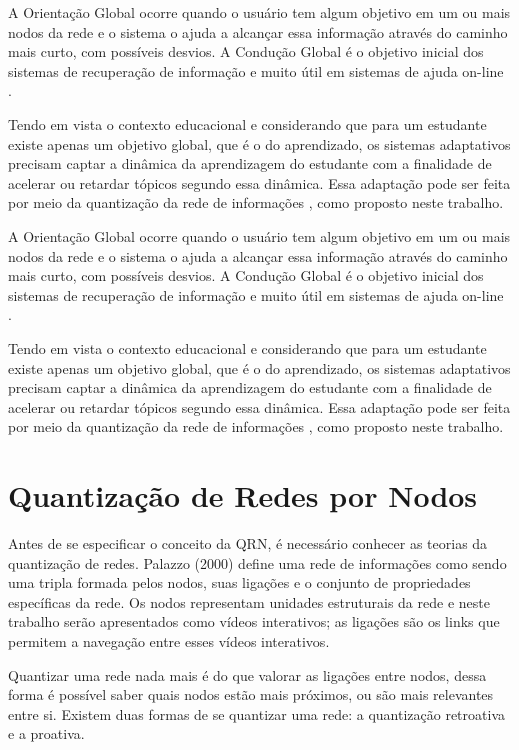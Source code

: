 A Orientação Global ocorre quando o usuário tem algum objetivo em um ou mais nodos da rede e o sistema o ajuda a alcançar essa informação através do caminho mais curto, com possíveis desvios. A Condução Global é o objetivo inicial dos sistemas de recuperação de informação e muito útil em sistemas de ajuda on-line \cite{brusilovsky1996, palazzo2000}.

Tendo em vista o contexto educacional e considerando que para um estudante existe apenas um objetivo global, que é o do aprendizado, os sistemas adaptativos precisam captar a dinâmica da aprendizagem do estudante com a finalidade de acelerar ou retardar tópicos segundo essa dinâmica. Essa adaptação pode ser feita por meio da quantização da rede de informações \cite{palazzo2000}, como proposto neste trabalho.

A Orientação Global ocorre quando o usuário tem algum objetivo em um ou mais nodos da rede e o sistema o ajuda a alcançar essa informação através do caminho mais curto, com possíveis desvios. A Condução Global é o objetivo inicial dos sistemas de recuperação de informação e muito útil em sistemas de ajuda on-line \cite{brusilovsky1996, palazzo2000}.

Tendo em vista o contexto educacional e considerando que para um estudante existe apenas um objetivo global, que é o do aprendizado, os sistemas adaptativos precisam captar a dinâmica da aprendizagem do estudante com a finalidade de acelerar ou retardar tópicos segundo essa dinâmica. Essa adaptação pode ser feita por meio da quantização da rede de informações \cite{palazzo2000}, como proposto neste trabalho.

\section{Quantização de Redes por Nodos}

Antes de se especificar o conceito da QRN, é necessário conhecer as teorias da quantização de redes. Palazzo (2000) define uma rede de informações como sendo uma tripla formada pelos nodos, suas ligações e o conjunto de propriedades específicas da rede. Os nodos representam unidades estruturais da rede e neste trabalho serão apresentados como vídeos interativos; as ligações são os links que permitem a navegação entre esses vídeos interativos.

Quantizar uma rede nada mais é do que valorar as ligações entre nodos, dessa forma é possível saber quais nodos estão mais próximos, ou são mais relevantes entre si. Existem duas formas de se quantizar uma rede: a quantização retroativa e a proativa. 

